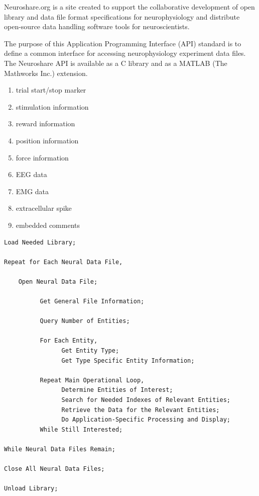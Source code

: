 Neuroshare.org is a site created to support the collaborative development of
open library and data file format specifications for neurophysiology and
distribute open-source data handling software tools  for neuroscientists.

The purpose of this Application Programming Interface (API) standard is to
define a common interface for accessing neurophysiology experiment data files.
The Neuroshare API is available as a C library and as a MATLAB (The Mathworks
Inc.) extension. 
 
\begin{enumerate}
  \item trial start/stop marker
    
  \item stimulation information
  
  \item reward information
  
  \item position information
  
  \item force information
  
  \item EEG data
  
  \item EMG data
  
  \item extracellular spike
  
  \item embedded comments
\end{enumerate}

\begin{verbatim}
Load Needed Library;

Repeat for Each Neural Data File,

    Open Neural Data File;

          Get General File Information;

          Query Number of Entities;

          For Each Entity,
                Get Entity Type;
                Get Type Specific Entity Information;

          Repeat Main Operational Loop,
                Determine Entities of Interest;
                Search for Needed Indexes of Relevant Entities;
                Retrieve the Data for the Relevant Entities;
                Do Application-Specific Processing and Display;
          While Still Interested;

While Neural Data Files Remain;

Close All Neural Data Files;

Unload Library;
\end{verbatim}

